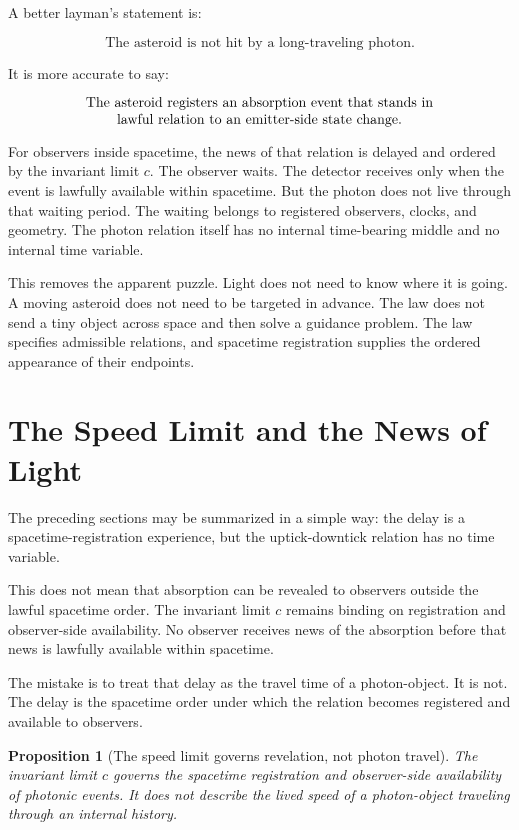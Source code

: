 \documentclass[12pt,onecolumn]{article}
\newtheorem{proposition}{Proposition}
\begin{document}
A better layman's statement is:

\[
\text{The asteroid is not hit by a long-traveling photon.}
\]

It is more accurate to say:

\[
\parbox{0.8\linewidth}{\centering The asteroid registers an absorption event that stands in lawful relation to an emitter-side state change.}
\]

For observers inside spacetime, the news of that relation is delayed and ordered by the invariant limit $c$. The observer waits. The detector receives only when the event is lawfully available within spacetime. But the photon does not live through that waiting period. The waiting belongs to registered observers, clocks, and geometry. The photon relation itself has no internal time-bearing middle and no internal time variable.

This removes the apparent puzzle. Light does not need to know where it is going. A moving asteroid does not need to be targeted in advance. The law does not send a tiny object across space and then solve a guidance problem. The law specifies admissible relations, and spacetime registration supplies the ordered appearance of their endpoints.

\section{The Speed Limit and the News of Light}

The preceding sections may be summarized in a simple way: the delay is a spacetime-registration experience, but the uptick-downtick relation has no time variable.

This does not mean that absorption can be revealed to observers outside the lawful spacetime order. The invariant limit $c$ remains binding on registration and observer-side availability. No observer receives news of the absorption before that news is lawfully available within spacetime.

The mistake is to treat that delay as the travel time of a photon-object. It is not. The delay is the spacetime order under which the relation becomes registered and available to observers.

\begin{proposition}[The speed limit governs revelation, not photon travel]
The invariant limit $c$ governs the spacetime registration and observer-side availability of photonic events. It does not describe the lived speed of a photon-object traveling through an internal history.
\end{proposition}
\end{document}
